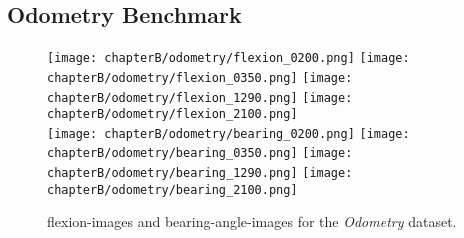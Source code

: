 \subsection{Odometry Benchmark}
\begin{figure}[H]
    \texttt{[image: chapterB/odometry/flexion\_0200.png]}%
    \texttt{[image: chapterB/odometry/flexion\_0350.png]}%
    \texttt{[image: chapterB/odometry/flexion\_1290.png]}%
    \texttt{[image: chapterB/odometry/flexion\_2100.png]}\\
    \texttt{[image: chapterB/odometry/bearing\_0200.png]}%
    \texttt{[image: chapterB/odometry/bearing\_0350.png]}%
    \texttt{[image: chapterB/odometry/bearing\_1290.png]}%
    \texttt{[image: chapterB/odometry/bearing\_2100.png]}\\
    \caption{\glspl{flexion-image} and \glspl{bearing-angle-image} for the \emph{Odometry} dataset.}
\end{figure}

